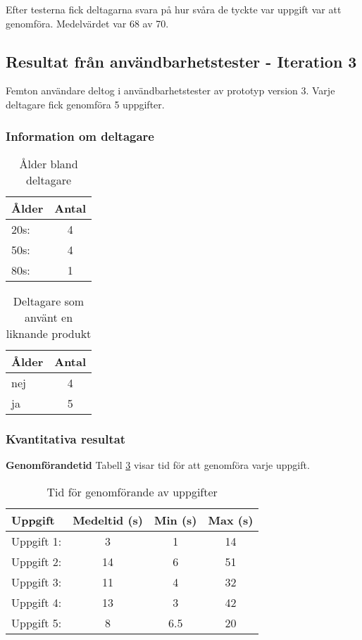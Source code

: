 Efter testerna fick deltagarna svara på hur svåra de tyckte var uppgift var att genomföra. Medelvärdet var 68 av 70.




\subsection{Resultat från användbarhetstester - Iteration 3}

Femton användare deltog i användbarhetstester av prototyp version 3. Varje deltagare fick genomföra 5 uppgifter. 

\subsubsection{Information om deltagare}

\begin{table}[H]
\centering
\begin{tabular}{|l|c|}
\hline
\textbf{Ålder} & \textbf{Antal} \\
\hline
20s:  & 4  \\ 
50s:  & 4  \\
80s:  & 1  \\
\hline
\end{tabular}
\caption{Ålder bland deltagare}
\label{tab:age2}
\end{table}

\begin{table}[H]
\centering
\begin{tabular}{|l|c|}
\hline
\textbf{Ålder} & \textbf{Antal} \\
\hline
nej  & 4   \\
ja  & 5  \\
\hline
\end{tabular}
\caption{Deltagare som använt en liknande produkt}
\label{tab:exp2}
\end{table}

\subsubsection{Kvantitativa resultat}

\textbf{Genomförandetid}
Tabell \ref{tab:tid} visar tid för att genomföra varje uppgift.
\begin{table}[H]
\centering
\begin{tabular}{|l|c|c|c|}
\hline
\textbf{Uppgift} & \textbf{Medeltid (s)} & \textbf{Min (s)} & \textbf{Max (s)} \\
\hline
Uppgift 1:  & 3 & 1 & 14 \\
Uppgift 2:  & 14 & 6 & 51\\
Uppgift 3:  & 11 & 4 & 32\\
Uppgift 4:  & 13 & 3 & 42\\
Uppgift 5:  & 8 & 6.5 & 20\\
\hline
\end{tabular}
\caption{Tid för genomförande av uppgifter}
\label{tab:tid}
\end{table}


